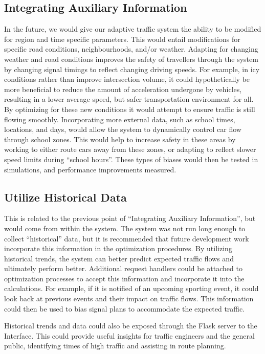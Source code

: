 \documentclass{report}
\begin{document}
\subsection{Integrating Auxiliary Information}
In the future, we would give our adaptive traffic system the ability to be modified for region and time specific parameters. 
This would entail modifications for specific road conditions, neighbourhoods, and/or weather.
Adapting for changing weather and road conditions improves the safety of travellers through the system by changing signal timings to reflect changing driving speeds.
For example, in icy conditions rather than improve intersection volume, it could hypothetically be more beneficial to reduce the amount of acceleration undergone by vehicles, resulting in a lower average speed, but safer transportation environment for all.
By optimizing for these new conditions it would attempt to ensure traffic is still flowing smoothly.
Incorporating more external data, such as school times, locations, and days, would allow the system to dynamically control car flow through school zones.
This would help to increase safety in these areas by working to either route cars away from these zones, or adapting to reflect slower speed limits during ``school hours''.
These types of biases would then be tested in simulations, and performance improvements measured.

\subsection{Utilize Historical Data}
This is related to the previous point of ``Integrating Auxiliary Information”, but would come from within the system. The system was not run long enough to collect ``historical” data, but it is recommended that future development work incorporate this information in the optimization procedures. 
By utilizing historical trends, the system can better predict expected traffic flows and ultimately perform better. 
Additional request handlers could be attached to optimization processes to accept this information and incorporate it into the calculations. 
For example, if it is notified of an upcoming sporting event, it could look back at previous events and their impact on traffic flows. 
This information could then be used to bias signal plans to accommodate the expected traffic.

Historical trends and data could also be exposed through the Flask server to the Interface. 
This could provide useful insights for traffic engineers and the general public, identifying times of high traffic and assisting in route planning.
\end{document}
